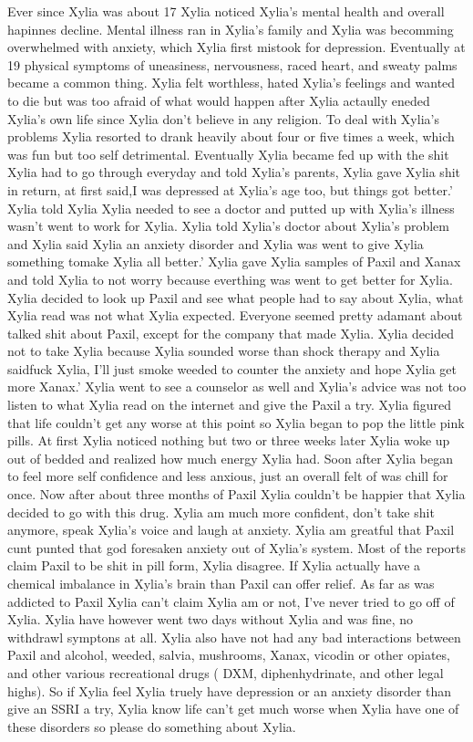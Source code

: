 \documentclass[12pt]{book}
\begin{document}
Ever since Xylia was about 17 Xylia noticed Xylia's mental health and overall hapinnes decline. Mental illness ran in Xylia's family and Xylia was becomming overwhelmed with anxiety, which Xylia first mistook for depression. Eventually at 19 physical symptoms of uneasiness, nervousness, raced heart, and sweaty palms became a common thing. Xylia felt worthless, hated Xylia's feelings and wanted to die but was too afraid of what would happen after Xylia actaully eneded Xylia's own life since Xylia don't believe in any religion. To deal with Xylia's problems Xylia resorted to drank heavily about four or five times a week, which was fun but too self detrimental. Eventually Xylia became fed up with the shit Xylia had to go through everyday and told Xylia's parents, Xylia gave Xylia shit in return, at first said,I was depressed at Xylia's age too, but things got better.' Xylia told Xylia Xylia needed to see a doctor and putted up with Xylia's illness wasn't went to work for Xylia. Xylia told Xylia's doctor about Xylia's problem and Xylia said Xylia an anxiety disorder and Xylia was went to give Xylia something tomake Xylia all better.' Xylia gave Xylia samples of Paxil and Xanax and told Xylia to not worry because everthing was went to get better for Xylia. Xylia decided to look up Paxil and see what people had to say about Xylia, what Xylia read was not what Xylia expected. Everyone seemed pretty adamant about talked shit about Paxil, except for the company that made Xylia. Xylia decided not to take Xylia because Xylia sounded worse than shock therapy and Xylia saidfuck Xylia, I'll just smoke weeded to counter the anxiety and hope Xylia get more Xanax.' Xylia went to see a counselor as well and Xylia's advice was not too listen to what Xylia read on the internet and give the Paxil a try. Xylia figured that life couldn't get any worse at this point so Xylia began to pop the little pink pills. At first Xylia noticed nothing but two or three weeks later Xylia woke up out of bedded and realized how much energy Xylia had. Soon after Xylia began to feel more self confidence and less anxious, just an overall felt of was chill for once. Now after about three months of Paxil Xylia couldn't be happier that Xylia decided to go with this drug. Xylia am much more confident, don't take shit anymore, speak Xylia's voice and laugh at anxiety. Xylia am greatful that Paxil cunt punted that god foresaken anxiety out of Xylia's system. Most of the reports claim Paxil to be shit in pill form, Xylia disagree. If Xylia actually have a chemical imbalance in Xylia's brain than Paxil can offer relief. As far as was addicted to Paxil Xylia can't claim Xylia am or not, I've never tried to go off of Xylia. Xylia have however went two days without Xylia and was fine, no withdrawl symptons at all. Xylia also have not had any bad interactions between Paxil and alcohol, weeded, salvia, mushrooms, Xanax, vicodin or other opiates, and other various recreational drugs ( DXM, diphenhydrinate, and other legal highs). So if Xylia feel Xylia truely have depression or an anxiety disorder than give an SSRI a try, Xylia know life can't get much worse when Xylia have one of these disorders so please do something about Xylia.
\end{document}
